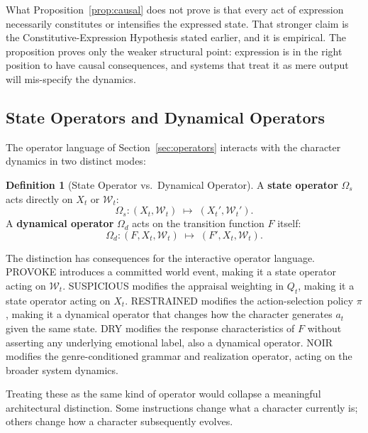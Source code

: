 \documentclass[11pt,a4paper]{article}
\theoremstyle{plain}
\theoremstyle{definition}
\newtheorem{definition}[theorem]{Definition}
\theoremstyle{remark}
\begin{document}
What Proposition~\ref{prop:causal} does not prove is that every act of expression necessarily constitutes or intensifies the expressed state. That stronger claim is the Constitutive-Expression Hypothesis stated earlier, and it is empirical. The proposition proves only the weaker structural point: expression is in the right position to have causal consequences, and systems that treat it as mere output will mis-specify the dynamics.

\subsection{State Operators and Dynamical Operators}

The operator language of Section~\ref{sec:operators} interacts with the character dynamics in two distinct modes:

\begin{definition}[State Operator vs.\ Dynamical Operator]
A \textbf{state operator} $\Omega_s$ acts directly on $X_t$ or $\mathcal{W}_t$:
\[
\Omega_s : (X_t, \mathcal{W}_t) \;\mapsto\; (X_t', \mathcal{W}_t').
\]
A \textbf{dynamical operator} $\Omega_d$ acts on the transition function $F$ itself:
\[
\Omega_d : (F, X_t, \mathcal{W}_t) \;\mapsto\; (F', X_t, \mathcal{W}_t).
\]
\end{definition}

\begin{center}
\end{center}

The distinction has consequences for the interactive operator language. \textsc{PROVOKE} introduces a committed world event, making it a state operator acting on $\mathcal{W}_t$. \textsc{SUSPICIOUS} modifies the appraisal weighting in $Q_t$, making it a state operator acting on $X_t$. \textsc{RESTRAINED} modifies the action-selection policy $\pi$, making it a dynamical operator that changes how the character generates $a_t$ given the same state. \textsc{DRY} modifies the response characteristics of $F$ without asserting any underlying emotional label, also a dynamical operator. \textsc{NOIR} modifies the genre-conditioned grammar and realization operator, acting on the broader system dynamics.

Treating these as the same kind of operator would collapse a meaningful architectural distinction. Some instructions change what a character currently is; others change how a character subsequently evolves.
\end{document}
